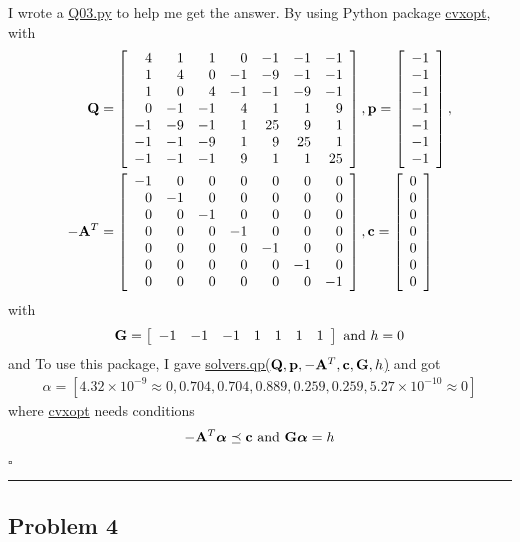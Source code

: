\documentclass[12pt]{article}
\newcommand*{\QEDB}{\hfill\ensuremath{\square}}
\newcommand{\SBrackets}[1]{\left[#1\right]}
\newcommand{\BF}[1]{{\bf#1}}
\newcommand{\SciNum}[2]{#1\times{10}^{#2}}
\newcommand{\Matrix}[2]{\SBrackets{\begin{array}{#1}#2\end{array}}}
\newcommand{\horrule}[1]{\rule{\linewidth}{#1}}
\begin{document}
I wrote a \url{Q03.py} to help me get the answer. By using Python package \url{cvxopt}, with
\begin{align}
\BF{Q}&=\Matrix{rrrrrrr}{4&1&1&0&-1&-1&-1\\1&4&0&-1&-9&-1&-1\\1&0&4&-1&-1&-9&-1\\0&-1&-1&4&1&1&9\\-1&-9&-1&1&25&9&1\\-1&-1&-9&1&9&25&1\\-1&-1&-1&9&1&1&25},\BF{p}=\Matrix{r}{-1\\-1\\-1\\-1\\-1\\-1\\-1},\\
-\BF{A}^T&=\Matrix{rrrrrrr}{-1&0&0&0&0&0&0\\0&-1&0&0&0&0&0\\0&0&-1&0&0&0&0\\0&0&0&-1&0&0&0\\0&0&0&0&-1&0&0\\0&0&0&0&0&-1&0\\0&0&0&0&0&0&-1},\BF{c}=\Matrix{c}{0\\0\\0\\0\\0\\0\\0}
\end{align}
with
\begin{align}
\BF{G}=\Matrix{ccccccc}{-1&-1&-1&1&1&1&1}\text{ and }h=0
\end{align}
and
To use this package, I gave \url{solvers.qp(}$\BF{Q}, \BF{p}, -\BF{A}^T, \BF{c},\BF{G},h$\url{)} and got
\begin{align}
\alpha=\SBrackets{\SciNum{4.32}{-9}\approx0,0.704,0.704,0.889,0.259,0.259,\SciNum{5.27}{-10}\approx0}
\end{align}
where \url{cvxopt} needs conditions
\begin{align}
-\BF{A}^T{\bm\alpha}\preceq\BF{c}\text{ and }\BF{G}\bm{\alpha}=h
\end{align}

\QEDB

\horrule{0.5pt}

\subsection*{Problem 4}
\end{document}
